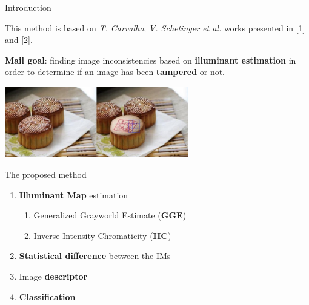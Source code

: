 
\begin{tframe}{Introduction}

This method is based on \emph{T. Carvalho}, \emph{V. Schetinger et al. }works presented in [1] and [2].
\vspace{1cm}

\textbf{Mail goal}: finding image inconsistencies based on \textbf{illuminant estimation} in order to determine if an image has been \textbf{tampered} or not.

\begin{center}
\includegraphics[width=0.6\textwidth]{images/cakes.jpg}
\end{center}

\end{tframe}


\begin{tframe}{The proposed method}
\vspace{0.2cm}
\begin{enumerate}
\item \textbf{Illuminant Map} estimation
\vspace{0.2cm}
\begin{enumerate}
\item Generalized Grayworld Estimate (\textbf{GGE})
\vspace{0.2cm}
\item Inverse-Intensity Chromaticity (\textbf{IIC})
\vspace{0.2cm}
\end{enumerate}
\item \textbf{Statistical difference} between the IMs
\vspace{0.2cm}
\item Image \textbf{descriptor}
\vspace{0.2cm}
\item \textbf{Classification}
\end{enumerate}

\end{tframe}


